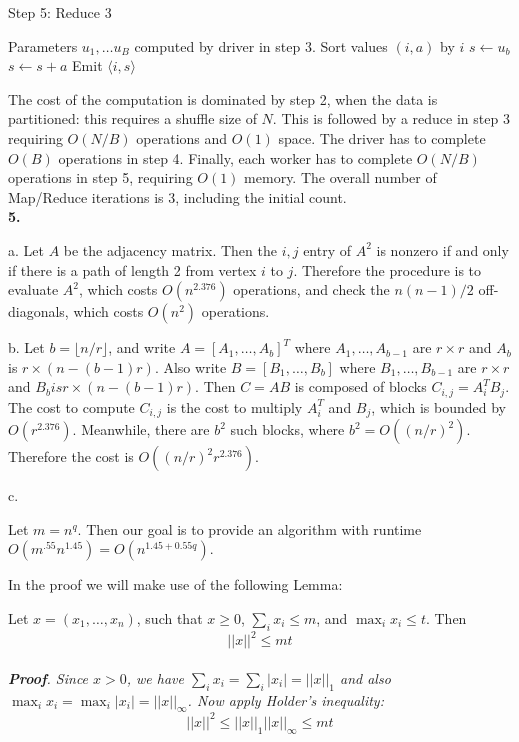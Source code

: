 \documentclass[11pt]{article}
\begin{document}
\begin{algorithm}[H]
\caption{Step 5: Reduce 3}
\begin{algorithmic}
\State Parameters $u_1,\hdots u_B$ computed by driver in step 3. 
  \State Sort values $(i, a)$ by $i$
  \State $s \leftarrow u_b$
    \State $s \leftarrow s + a$
    \State Emit $\langle i, s \rangle$
  \EndFor
\EndFunction
\end{algorithmic}
\end{algorithm}

The cost of the computation is dominated by step 2, when the data is
partitioned: this requires a shuffle size of $N$.  This is followed by
a reduce in step 3 requiring $O(N/B)$ operations and $O(1)$ space.
The driver has to complete $O(B)$ operations in step 4.  Finally, each
worker has to complete $O(N/B)$ operations in step 5, requiring $O(1)$
memory.  The overall number of Map/Reduce iterations is 3, including
the initial count.\\

\noindent\textbf{5.}

a. Let $A$ be the adjacency matrix.  Then the $i, j$ entry of $A^2$ is
nonzero if and only if there is a path of length 2 from vertex $i$ to
$j$.  Therefore the procedure is to evaluate $A^2$, which costs
$O(n^{2.376})$ operations, and check the $n(n-1)/2$ off-diagonals,
which costs $O(n^2)$ operations.

b. Let $b = \lfloor n/ r\rfloor$, and write $A = [A_1,\hdots, A_b]^T$
where $A_1, \hdots, A_{b-1}$ are $r \times r$ and $A_b$ is $r \times
(n - (b-1)r)$.  Also write $B = [B_1,\hdots, B_b]$ where $B_1,\hdots,
B_{b-1}$ are $r \times r$ and $B_b is r \times (n - (b-1)r)$.  Then $C
= AB$ is composed of blocks $C_{i,j} = A_i^T B_j$.  The cost to
compute $C_{i, j}$ is the cost to multiply $A_i^T$ and $B_j$, which is bounded by $O(r^{2.376})$.
Meanwhile, there are $b^2$ such blocks, where $b^2 = O((n/r)^2)$.
Therefore the cost is $O((n/r)^2 r^{2.376})$.

c.

Let $m = n^q$. Then our goal is to provide an algorithm with
runtime $O(m^{.55} n^{1.45}) = O(n^{1.45 + 0.55q})$.

In the proof we will make use of the following Lemma:
\begin{lem}
Let $x = (x_1,\hdots, x_n)$, such that $x \geq 0$, $\sum_i x_i  \leq m$, 
and $\max_i x_i \leq t$.
Then
\[
||x||^2 \leq mt
\]\\
\emph{ \textbf{Proof}.  Since $x > 0$, we have $\sum_i x_i = \sum_i
  |x_i| = ||x||_1$ and also $\max_i x_i = \max_i |x_i| =
  ||x||_\infty$.  Now apply Holder's inequality:
\[
||x||^2 \leq ||x||_1 ||x||_\infty \leq mt
\]
}
\end{lem}
\end{document}
